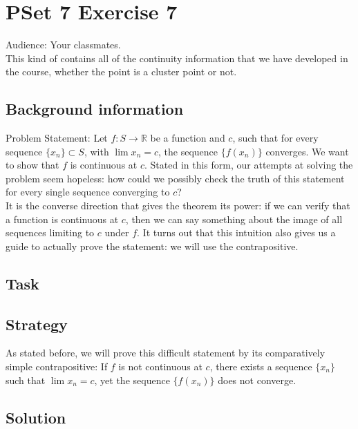 \documentclass[11 pt]{article}
\begin{document}
\section{PSet 7 Exercise 7}
Audience: Your classmates.\\
This kind of contains all of the continuity information that we have developed in the course, whether the point is a cluster point or not.
\begin{multicols*}{2} 
\subsection{Background information}
Problem Statement: Let $f:S\to\mathbb{R}$ be a function and $c$, such that for every sequence $\{x_n\}\subset S$, with $\lim x_n=c$, the sequence $\{f(x_n)\}$ converges. We want to show that $f$ is continuous at $c$.
Stated in this form, our attempts at solving the problem seem hopeless: how could we possibly check the truth of this statement for every single sequence converging to $c$?\\
It is the converse direction that gives the theorem its power: if we can verify that a function is continuous at $c$, then we can say something about the image of all sequences limiting to $c$ under $f$. It turns out that this intuition also gives us a guide to actually prove the statement: we will use the contrapositive.
\subsection{Task}
\subsection{Strategy}
As stated before, we will prove this difficult statement by its comparatively simple contrapositive: If $f$ is not continuous at $c$, there exists a sequence $\{x_n\}$ such that $\lim x_n=c$, yet the sequence $\{f(x_n)\}$ does not converge.
\columnbreak
\subsection{Solution}
\end{multicols*}
\pagebreak
\end{document}
